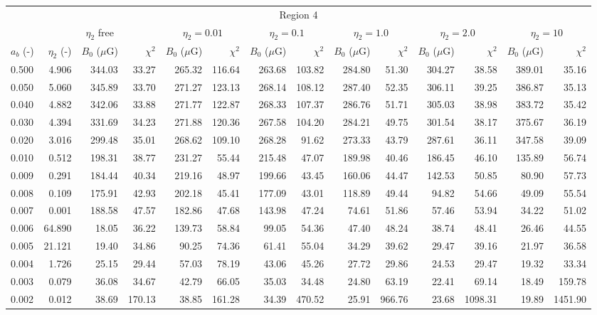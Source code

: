 \begin{tabular}{@{}lrrrrrrrrrrrrr@{}}
\toprule
\multicolumn{14}{c}{Region 4} \\
\cmidrule{1-14}
{} & \multicolumn{3}{c}{$\eta_2$ free} & \multicolumn{2}{c}{$\eta_2 = 0.01$}
   & \multicolumn{2}{c}{$\eta_2 = 0.1$} & \multicolumn{2}{c}{$\eta_2 = 1.0$}
   & \multicolumn{2}{c}{$\eta_2 = 2.0$} & \multicolumn{2}{c}{$\eta_2 = 10$} \\
\cmidrule(lr){2-4} \cmidrule(lr){5-6} \cmidrule(lr){7-8} \cmidrule(lr){9-10}
    \cmidrule(lr){11-12} \cmidrule(lr){13-14}
$a_b$ (-) & $\eta_2$ (-) & $B_0$ ($\mu$G) & $\chi^2$
& $B_0$ ($\mu$G) & $\chi^2$ & $B_0$ ($\mu$G) & $\chi^2$
& $B_0$ ($\mu$G) & $\chi^2$ & $B_0$ ($\mu$G) & $\chi^2$
& $B_0$ ($\mu$G) & $\chi^2$ \\
\cmidrule{1-14}
0.500 & 4.906 & 344.03 & 33.27 & 265.32 & 116.64 & 263.68 & 103.82 & 284.80 & 51.30 & 304.27 & 38.58 & 389.01 & 35.16 \\
0.050 & 5.060 & 345.89 & 33.70 & 271.27 & 123.13 & 268.14 & 108.12 & 287.40 & 52.35 & 306.11 & 39.25 & 386.87 & 35.13 \\
0.040 & 4.882 & 342.06 & 33.88 & 271.77 & 122.87 & 268.33 & 107.37 & 286.76 & 51.71 & 305.03 & 38.98 & 383.72 & 35.42 \\
0.030 & 4.394 & 331.69 & 34.23 & 271.88 & 120.36 & 267.58 & 104.20 & 284.21 & 49.75 & 301.54 & 38.17 & 375.67 & 36.19 \\
0.020 & 3.016 & 299.48 & 35.01 & 268.62 & 109.10 & 268.28 & 91.62 & 273.33 & 43.79 & 287.61 & 36.11 & 347.58 & 39.09 \\
0.010 & 0.512 & 198.31 & 38.77 & 231.27 & 55.44 & 215.48 & 47.07 & 189.98 & 40.46 & 186.45 & 46.10 & 135.89 & 56.74 \\
0.009 & 0.291 & 184.44 & 40.34 & 219.16 & 48.97 & 199.66 & 43.45 & 160.06 & 44.47 & 142.53 & 50.85 & 80.90 & 57.73 \\
0.008 & 0.109 & 175.91 & 42.93 & 202.18 & 45.41 & 177.09 & 43.01 & 118.89 & 49.44 & 94.82 & 54.66 & 49.09 & 55.54 \\
0.007 & 0.001 & 188.58 & 47.57 & 182.86 & 47.68 & 143.98 & 47.24 & 74.61 & 51.86 & 57.46 & 53.94 & 34.22 & 51.02 \\
0.006 & 64.890 & 18.05 & 36.22 & 139.73 & 58.84 & 99.05 & 54.36 & 47.40 & 48.24 & 38.74 & 48.41 & 26.46 & 44.55 \\
0.005 & 21.121 & 19.40 & 34.86 & 90.25 & 74.36 & 61.41 & 55.04 & 34.29 & 39.62 & 29.47 & 39.16 & 21.97 & 36.58 \\
0.004 & 1.726 & 25.15 & 29.44 & 57.03 & 78.19 & 43.06 & 45.26 & 27.72 & 29.86 & 24.53 & 29.47 & 19.32 & 33.34 \\
0.003 & 0.079 & 36.08 & 34.67 & 42.79 & 66.05 & 35.03 & 34.48 & 24.80 & 63.19 & 22.41 & 69.14 & 18.49 & 159.78 \\
0.002 & 0.012 & 38.69 & 170.13 & 38.85 & 161.28 & 34.39 & 470.52 & 25.91 & 966.76 & 23.68 & 1098.31 & 19.89 & 1451.90 \\


\end{tabular}
